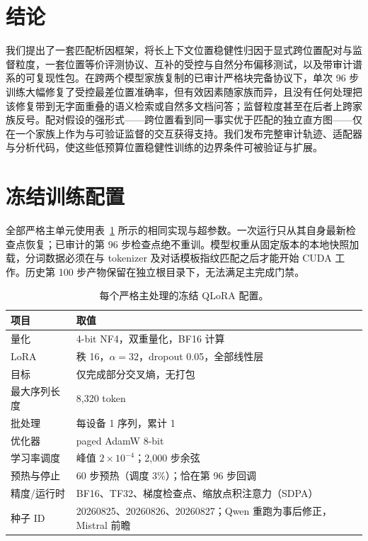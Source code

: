 \documentclass[11pt]{article}
\begin{document}
\section{结论}

我们提出了一套匹配析因框架，将长上下文位置稳健性归因于显式跨位置配对与监督粒度，一套位置等价评测协议、互补的受控与自然分布偏移测试，以及带审计谱系的可复现性包。在跨两个模型家族复制的已审计严格块完备协议下，单次 96 步训练大幅修复了受控最差位置准确率，但有效因素随家族而异，且没有任何处理把该修复带到无字面重叠的语义检索或自然多文档问答；监督粒度甚至在后者上跨家族反号。配对假设的强形式——跨位置看到同一事实优于匹配的独立直方图——仅在一个家族上作为与可验证监督的交互获得支持。我们发布完整审计轨迹、适配器与分析代码，使这些低预算位置稳健性训练的边界条件可被验证与扩展。

\appendix

\section{冻结训练配置}

全部严格主单元使用表~\ref{tab:training-config} 所示的相同实现与超参数。一次运行只从其自身最新检查点恢复；已审计的第 96 步检查点绝不重训。模型权重从固定版本的本地快照加载，分词数据必须在与 tokenizer 及对话模板指纹匹配之后才能开始 CUDA 工作。历史第 100 步产物保留在独立根目录下，无法满足主完成门禁。

\begin{table}[h]
\centering
\small
\caption{每个严格主处理的冻结 QLoRA 配置。}
\label{tab:training-config}
\begin{tabularx}{\linewidth}{@{}lX@{}}
\toprule
项目 & 取值 \\
\midrule
量化 & 4-bit NF4，双重量化，BF16 计算 \\
LoRA & 秩 16，$\alpha=32$，dropout 0.05，全部线性层 \\
目标 & 仅完成部分交叉熵，无打包 \\
最大序列长度 & 8,320 token \\
批处理 & 每设备 1 序列，累计 1 \\
优化器 & paged AdamW 8-bit \\
学习率调度 & 峰值 $2\times10^{-4}$；2,000 步余弦 \\
预热与停止 & 60 步预热（调度 3\%）；恰在第 96 步回调 \\
精度/运行时 & BF16、TF32、梯度检查点、缩放点积注意力（SDPA） \\
种子 ID & 20260825、20260826、20260827；Qwen 重跑为事后修正，Mistral 前瞻 \\
\bottomrule
\end{tabularx}
\end{table}
\end{document}
